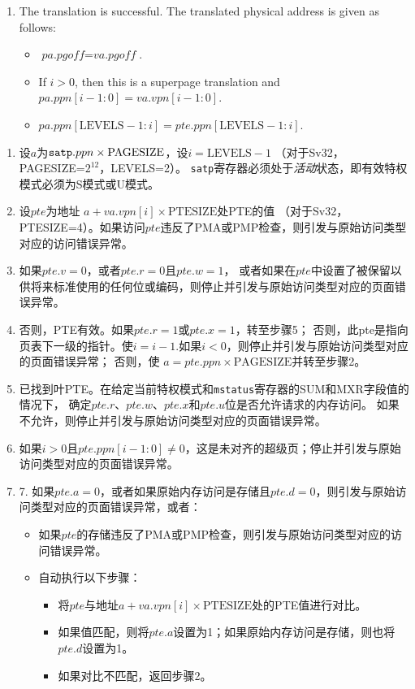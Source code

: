 \begin{enumerate}
  \item The translation is successful. The translated physical address is
    given as follows:
  \begin{itemize}
  \item $\textit{pa.pgoff} = \textit{va.pgoff}$.
  \item If $i>0$, then this is a superpage translation and $pa.ppn[i-1:0]=va.vpn[i-1:0]$.
  \item $pa.ppn[\textrm{LEVELS} - 1:i] = pte.ppn[\textrm{LEVELS} - 1:i]$.
  \end{itemize}
  
\end{enumerate}

\begin{enumerate}

\item 设$a$为${\tt satp}.ppn \times \textrm{PAGESIZE}$，设$i=\textrm{LEVELS} - 1$
（对于Sv32，PAGESIZE=$2^{12}$，LEVELS=2）。
{\tt satp}寄存器必须处于{\em 活动}状态，即有效特权模式必须为S模式或U模式。

\item 设$pte$为地址 $a+va.vpn[i]\times \textrm{PTESIZE}$处PTE的值
（对于Sv32，PTESIZE=4）。如果访问$pte$违反了PMA或PMP检查，则引发与原始访问类型对应的访问错误异常。

\item 如果$pte.v=0$，或者$pte.r=0$且$pte.w=1$，
或者如果在$pte$中设置了被保留以供将来标准使用的任何位或编码，则停止并引发与原始访问类型对应的页面错误异常。

\item 否则，PTE有效。如果$pte.r=1$或$pte.x=1$，转至步骤5；
否则，此pte是指向页表下一级的指针。使$i=i-1$.如果$i<0$，则停止并引发与原始访问类型对应的页面错误异常；
否则，使 $a=pte.ppn \times \textrm{PAGESIZE}$并转至步骤2。

\item 已找到叶PTE。在给定当前特权模式和{\tt mstatus}寄存器的SUM和MXR字段值的情况下，
确定$pte.r$、$pte.w$、$pte.x$和$pte.u$位是否允许请求的内存访问。
如果不允许，则停止并引发与原始访问类型对应的页面错误异常。

\item 如果$i>0$且$pte.ppn[i-1:0]\neq 0$，这是未对齐的超级页；停止并引发与原始访问类型对应的页面错误异常。

\item 7. 如果$pte.a=0$，或者如果原始内存访问是存储且$pte.d=0$，则引发与原始访问类型对应的页面错误异常，或者：
  \begin{itemize}
  \item 如果$pte$的存储违反了PMA或PMP检查，则引发与原始访问类型对应的访问错误异常。
  \item 自动执行以下步骤：
    \begin{itemize}
      \item 将$pte$与地址$a+va.vpn[i]\times \textrm{PTESIZE}$处的PTE值进行对比。
      \item 如果值匹配，则将$pte.a$设置为1；如果原始内存访问是存储，则也将$pte.d$设置为1。
      \item 如果对比不匹配，返回步骤2。
    \end{itemize}
  \end{itemize}


\end{enumerate}
